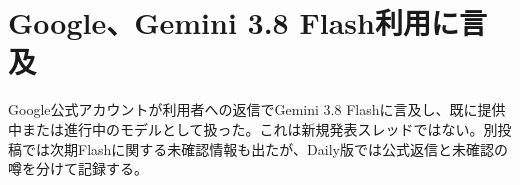 \section{Google、Gemini 3.8 Flash利用に言及}

Google公式アカウントが利用者への返信でGemini 3.8 Flashに言及し、既に提供中または進行中のモデルとして扱った。これは新規発表スレッドではない。別投稿では次期Flashに関する未確認情報も出たが、Daily版では公式返信と未確認の噂を分けて記録する。


